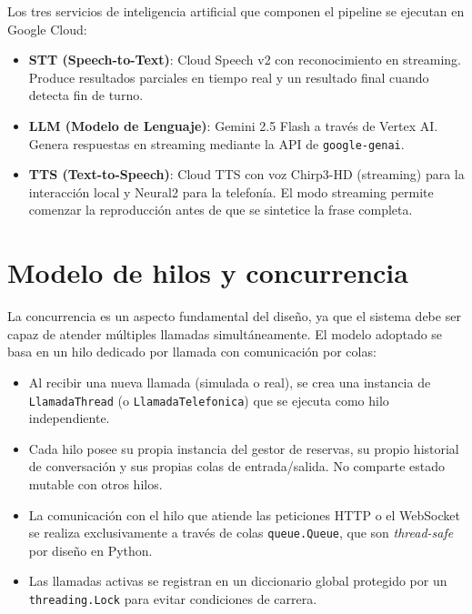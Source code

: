 Los tres servicios de inteligencia artificial que componen el pipeline se ejecutan en Google Cloud:

\begin{itemize}
    \item \textbf{STT (Speech-to-Text)}: Cloud Speech v2 con reconocimiento en streaming. Produce resultados parciales en tiempo real y un resultado final cuando detecta fin de turno.
    \item \textbf{LLM (Modelo de Lenguaje)}: Gemini 2.5 Flash a través de Vertex AI. Genera respuestas en streaming mediante la API de \texttt{google-genai}.
    \item \textbf{TTS (Text-to-Speech)}: Cloud TTS con voz Chirp3-HD (streaming) para la interacción local y Neural2 para la telefonía. El modo streaming permite comenzar la reproducción antes de que se sintetice la frase completa.
\end{itemize}


\section{Modelo de hilos y concurrencia}
\label{sec:modelo_hilos}

La concurrencia es un aspecto fundamental del diseño, ya que el sistema debe ser capaz de atender múltiples llamadas simultáneamente. El modelo adoptado se basa en un hilo dedicado por llamada con comunicación por colas:

\begin{itemize}
    \item Al recibir una nueva llamada (simulada o real), se crea una instancia de \texttt{LlamadaThread} (o \texttt{LlamadaTelefonica}) que se ejecuta como hilo independiente.
    \item Cada hilo posee su propia instancia del gestor de reservas, su propio historial de conversación y sus propias colas de entrada/salida. No comparte estado mutable con otros hilos.
    \item La comunicación con el hilo que atiende las peticiones HTTP o el WebSocket se realiza exclusivamente a través de colas \texttt{queue.Queue}, que son \textit{thread-safe} por diseño en Python.
    \item Las llamadas activas se registran en un diccionario global protegido por un \texttt{threading.Lock} para evitar condiciones de carrera.
\end{itemize}

